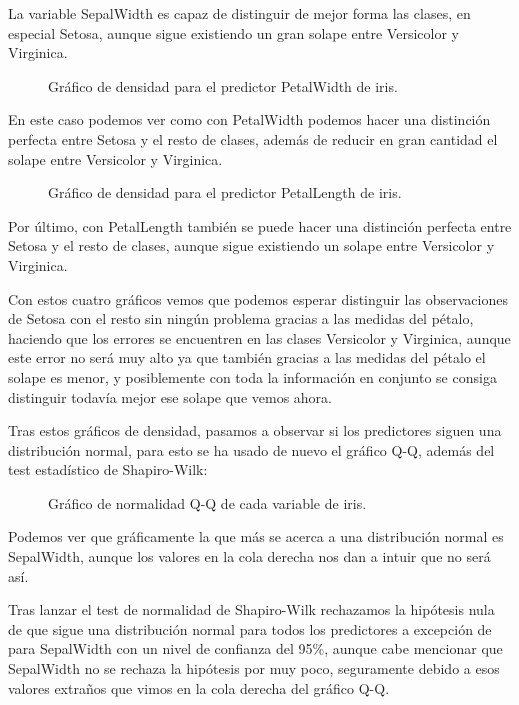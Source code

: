 La variable SepalWidth es capaz de distinguir de mejor forma las clases, en especial Setosa, aunque sigue existiendo un gran solape entre Versicolor y Virginica.

\begin{figure}[H]
	\centering
	
	\caption{Gráfico de densidad para el predictor PetalWidth de iris.}
	\label{fig:densidad_iris_PetalWidth}
\end{figure}

En este caso podemos ver como con PetalWidth podemos hacer una distinción perfecta entre Setosa y el resto de clases, además de reducir en gran cantidad el solape entre Versicolor y Virginica.

\begin{figure}[H]
	\centering
	
	\caption{Gráfico de densidad para el predictor PetalLength de iris.}
	\label{fig:densidad_iris_PetalLength}
\end{figure}

Por último, con PetalLength también se puede hacer una distinción perfecta entre Setosa y el resto de clases, aunque sigue existiendo un solape entre Versicolor y Virginica.

Con estos cuatro gráficos vemos que podemos esperar distinguir las observaciones de Setosa con el resto sin ningún problema gracias a las medidas del pétalo, haciendo que los errores se encuentren en las clases Versicolor y Virginica, aunque este error no será muy alto ya que también gracias a las medidas del pétalo el solape es menor, y posiblemente con toda la información en conjunto se consiga distinguir todavía mejor ese solape que vemos ahora.


Tras estos gráficos de densidad, pasamos a observar si los predictores siguen una distribución normal, para esto se ha usado de nuevo el gráfico Q-Q, además del test estadístico de Shapiro-Wilk:

\begin{figure}[H]
	\centering
	
	\caption{Gráfico de normalidad Q-Q de cada variable de iris.}
	\label{fig:qqplot_iris}
\end{figure}


Podemos ver que gráficamente la que más se acerca a una distribución normal es SepalWidth, aunque los valores en la cola derecha nos dan a intuir que no será así.

Tras lanzar el test de normalidad de Shapiro-Wilk rechazamos la hipótesis nula de que sigue una distribución normal para todos los predictores a excepción de para SepalWidth con un nivel de confianza del 95\%, aunque cabe mencionar que SepalWidth no se rechaza la hipótesis por muy poco, seguramente debido a esos valores extraños que vimos en la cola derecha del gráfico Q-Q.


